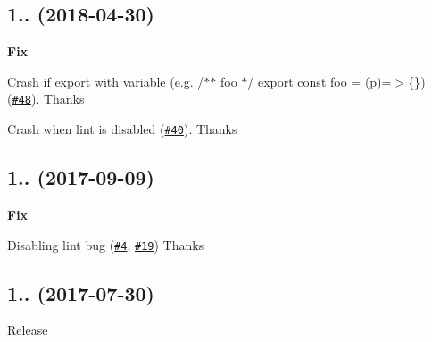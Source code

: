 \subsection*{1.. (2018-\/04-\/30)}


\begin{DoxyItemize}
\item {\bfseries Fix}
\begin{DoxyItemize}
\item Crash if export with variable (e.\+g. {\ttfamily /$\ast$$\ast$ foo $\ast$/ export const foo = (p)=$>$\{\}}) (\href{https://github.com/esdoc/esdoc-plugins/pull/48}{\tt \#48}). Thanks \href{https://github.com/paztis}{\tt }
\item Crash when lint is disabled (\href{https://github.com/esdoc/esdoc-plugins/pull/40}{\tt \#40}). Thanks \href{https://github.com/asis}{\tt }
\end{DoxyItemize}
\end{DoxyItemize}

\subsection*{1.. (2017-\/09-\/09)}


\begin{DoxyItemize}
\item {\bfseries Fix}
\begin{DoxyItemize}
\item Disabling lint bug (\href{https://github.com/esdoc/esdoc-plugins/pull/4}{\tt \#4}, \href{https://github.com/esdoc/esdoc-plugins/pull/19}{\tt \#19}) Thanks \href{https://github.com/pzuraq}{\tt } \href{https://github.com/moshest}{\tt }
\end{DoxyItemize}
\end{DoxyItemize}

\subsection*{1.. (2017-\/07-\/30)}


\begin{DoxyItemize}
\item Release 
\end{DoxyItemize}
